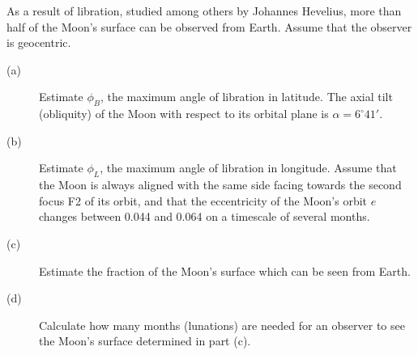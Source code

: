As a result of libration, studied among others by Johannes Hevelius, more
than half of the Moon's surface can be observed from Earth. Assume that the
observer is geocentric.

\begin{description}
\item[(a)] Estimate $\phi_B$, the maximum angle of libration in latitude. The
  axial tilt (obliquity) of the Moon with respect to its orbital plane is
  $\alpha = 6^\circ 41'$.
\item[(b)] Estimate $\phi_L$, the maximum angle of libration in longitude.
  Assume that the Moon is always aligned with the same side facing towards
  the second focus F2 of its orbit, and that the eccentricity of the Moon's
  orbit $e$ changes between 0.044 and 0.064 on a timescale of several months.
\item[(c)] Estimate the fraction of the Moon's surface which can be seen from
  Earth.
\item[(d)] Calculate how many months (lunations) are needed for an observer
  to see the Moon's surface determined in part (c).
\end{description}
